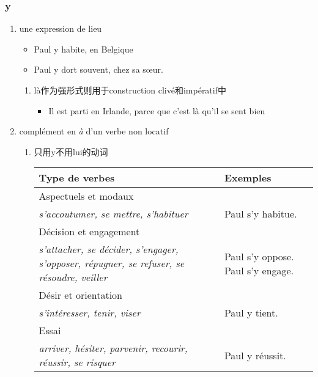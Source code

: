 \documentclass[UTF8]{report}
\begin{document}
\subsubsection{y}
\begin{enumerate}
    \item une expression de lieu
    \begin{itemize}
        \item Paul y habite, en Belgique
        \item Paul y dort souvent, chez sa sœur.
    \end{itemize}
    \begin{enumerate}
        \item là作为强形式则用于construction clivé和impératif中
        \begin{itemize}
            \item Il est parti en Irlande, parce que c’est là qu’il se sent bien
        \end{itemize}
    \end{enumerate}
    \item complément en \emph{à} d’un verbe non locatif 
    \begin{enumerate}
        \item 只用y不用lui的动词
    \begin{table}[H]
    \centering
    \begin{tabular}{|>{\RaggedRight\arraybackslash}p{8cm}|>{\RaggedRight\arraybackslash}p{5cm}|}
    \hline
    \rowcolor{cyan!20}
    \textbf{Type de verbes} & \textbf{Exemples} \\ 
    \hline

    Aspectuels et modaux & \\
    \textit{s'accoutumer, se mettre, s'habituer} & Paul s'y habitue. \\
    \hline

    Décision et engagement & \\
    \textit{s'attacher, se décider, s'engager, s'opposer, répugner, se refuser, se résoudre, veiller} & Paul s'y oppose. Paul s'y engage. \\
    \hline

    Désir et orientation & \\
    \textit{s'intéresser, tenir, viser} & Paul y tient. \\
    \hline

    Essai & \\
    \textit{arriver, hésiter, parvenir, recourir, réussir, se risquer} & Paul y réussit. \\
    \hline


\end{tabular}
\end{table}
\end{enumerate}
\end{enumerate}
\end{document}
